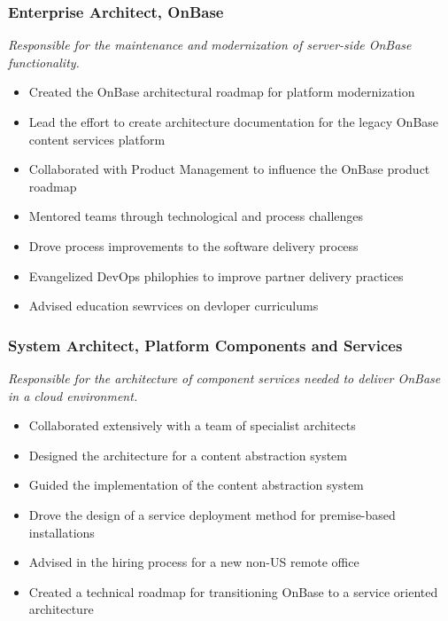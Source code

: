 \documentclass{cv_style}
\begin{document}
			\subsubsection*{Enterprise Architect, OnBase}
			\textit{Responsible for the maintenance and modernization of server-side OnBase functionality.}
			\begin{itemize}
				\item Created the OnBase architectural roadmap for platform modernization
				\item Lead the effort to create architecture documentation for the legacy OnBase content services platform 
				\item Collaborated with Product Management to influence the OnBase product roadmap
				\item Mentored teams through technological and process challenges
				\item Drove process improvements to the software delivery process
				\item Evangelized DevOps philophies to improve partner delivery practices
				\item Advised education sewrvices on devloper curriculums
			\end{itemize}

			\subsubsection*{System Architect, Platform Components and Services}
			\textit{Responsible for the architecture of component services needed to deliver OnBase in a cloud environment.} 
			\begin{itemize}
				\item Collaborated extensively with a team of specialist architects
				\item Designed the architecture for a content abstraction system
				\item Guided the implementation of the content abstraction system
				\item Drove the design of a service deployment method for premise-based installations
				\item Advised in the hiring process for a new non-US remote office	
				\item Created a technical roadmap for transitioning OnBase to a service oriented architecture
			\end{itemize}
\end{document}
